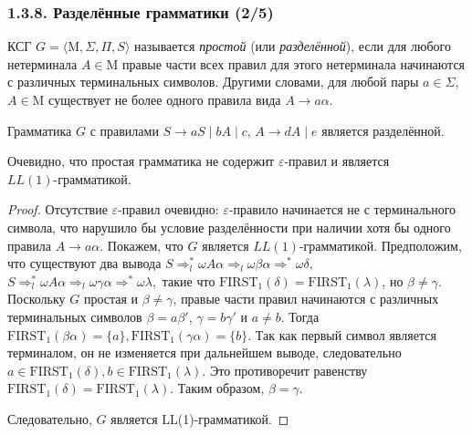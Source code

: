 \documentclass[mathserif,12pt,aspectratio=169]{beamer}
\renewcommand{\index}[1]{}
\def\odmkey#1#2{{\it\color{red} #1}\index{#2}}
\begin{document}
\begin{frame}
\frametitle{1.3.8. Разделённые грамматики (2/5)}

КСГ $G=\langle \mathrm{M}, \Sigma, \Pi, S \rangle$ называется \odmkey{простой}{Грамматика!простая}
(или \odmkey{разделённой}{Грамматика!разделённая}),
если для любого нетерминала $A \in\mathrm{M}$
правые части всех правил для этого нетерминала
начинаются с различных терминальных символов.
Другими словами, для любой пары $a\in \Sigma$, $A\in \mathrm{M}$
существует не более одного правила вида $A\to a\alpha$. 

\begin{example} Грамматика $ G $ с правилами
$  S \to aS \mid bA \mid c  $,
$  A \to dA \mid e  $
является разделённой.
\end{example}

\smallskip

\begin{remark}
Очевидно, что простая грамматика не содержит $\varepsilon$-правил
и является \\$LL(1)$-грамматикой.
\end{remark}

\begin{proof}
Отсутствие $\varepsilon$-правил очевидно: $\varepsilon$-правило начинается не с терминального символа, что нарушило бы условие разделённости при наличии хотя бы одного правила $A \to a\alpha$. 
Покажем, что $G$ является $LL(1)$-грамматикой. Предположим, что существуют два вывода
\(
S \Rightarrow_l^* \omega A\alpha \Rightarrow_l \omega\beta\alpha \Rightarrow^* \omega\delta,
\)
\(
S \Rightarrow_l^* \omega A\alpha \Rightarrow_l \omega\gamma\alpha \Rightarrow^* \omega\lambda,
\)
такие что $\mathrm{FIRST}_1(\delta) = \mathrm{FIRST}_1(\lambda)$, но $\beta \neq \gamma$.
Поскольку $G$ простая и $\beta \neq \gamma$, правые части правил начинаются с различных терминальных символов $\beta = a\beta'$, $\gamma = b\gamma'$ и $a \neq b$. Тогда
\(
\mathrm{FIRST}_1(\beta\alpha) = \{a\},  \mathrm{FIRST}_1(\gamma\alpha) = \{b\}.
\)
Так как первый символ является терминалом, он не изменяется при дальнейшем выводе, следовательно
\(
a \in \mathrm{FIRST}_1(\delta), b \in \mathrm{FIRST}_1(\lambda).
\)
Это противоречит равенству $\mathrm{FIRST}_1(\delta) = \mathrm{FIRST}_1(\lambda)$. Таким образом, $\beta = \gamma$.

Следовательно, $G$ является LL(1)-грамматикой.
\end{proof}

\end{frame}
\end{document}
